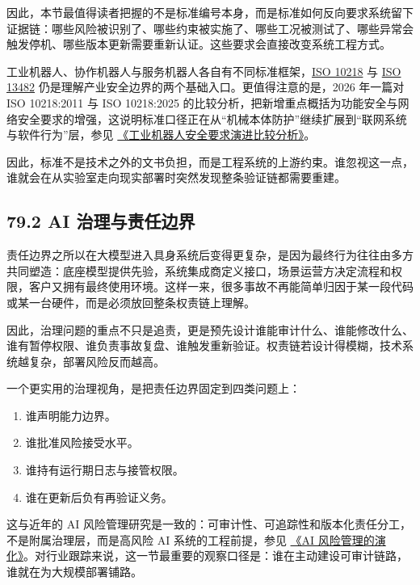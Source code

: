 因此，本节最值得读者把握的不是标准编号本身，而是标准如何反向要求系统留下证据链：哪些风险被识别了、哪些约束被实施了、哪些工况被测试了、哪些异常会触发停机、哪些版本更新需要重新认证。这些要求会直接改变系统工程方式。

工业机器人、协作机器人与服务机器人各自有不同标准框架，\href{https://www.iso.org/standard/59820.html}{ISO 10218} 与 \href{https://www.iso.org/standard/53820.html}{ISO 13482} 仍是理解产业安全边界的两个基础入口。更值得注意的是，2026 年一篇对 ISO 10218:2011 与 ISO 10218:2025 的比较分析，把新增重点概括为功能安全与网络安全要求的增强，这说明标准口径正在从“机械本体防护”继续扩展到“联网系统与软件行为”层，参见 \href{https://arxiv.org/abs/2602.17822}{《工业机器人安全要求演进比较分析》}。

因此，标准不是技术之外的文书负担，而是工程系统的上游约束。谁忽视这一点，谁就会在从实验室走向现实部署时突然发现整条验证链都需要重建。

\subsection*{79.2 AI 治理与责任边界}


责任边界之所以在大模型进入具身系统后变得更复杂，是因为最终行为往往由多方共同塑造：底座模型提供先验，系统集成商定义接口，场景运营方决定流程和权限，客户又拥有最终使用环境。这样一来，很多事故不再能简单归因于某一段代码或某一台硬件，而是必须放回整条权责链上理解。

因此，治理问题的重点不只是追责，更是预先设计谁能审计什么、谁能修改什么、谁有暂停权限、谁负责事故复盘、谁触发重新验证。权责链若设计得模糊，技术系统越复杂，部署风险反而越高。

一个更实用的治理视角，是把责任边界固定到四类问题上：

\begin{enumerate}
\item 谁声明能力边界。
\item 谁批准风险接受水平。
\item 谁持有运行期日志与接管权限。
\item 谁在更新后负有再验证义务。
\end{enumerate}

这与近年的 AI 风险管理研究是一致的：可审计性、可追踪性和版本化责任分工，不是附属治理层，而是高风险 AI 系统的工程前提，参见 \href{https://arxiv.org/abs/2401.15229}{《AI 风险管理的演化》}。对行业跟踪来说，这一节最重要的观察口径是：谁在主动建设可审计链路，谁就在为大规模部署铺路。

